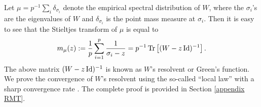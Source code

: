 Let $\mu=p^{-1}\sum_{i} \delta_{\sigma_i}$ denote the empirical spectral distribution of $W$, where the $\sigma_i$'s are the eigenvalues of $W$ and $\delta_{\sigma_i}$ is the point mass measure at $\sigma_i$. Then it is easy to see that the Stieltjes transform of $\mu$ is equal to
 \[ m_{\mu}(z) := \frac{1}{p}\sum_{i=1}^p \frac{1}{\sigma_i - z}= p^{-1}\operatorname{Tr}\left[(W-z\operatorname{Id})^{-1}\right]. \]
The above matrix $(W - z\operatorname{Id})^{-1}$ is known as $W$'s resolvent or Green's function.
We prove the convergence of $W$'s resolvent using the so-called ``local law'' with a sharp convergence rate \cite{isotropic,erdos2017dynamical,Anisotropic}. The complete proof is provided in Section \ref{appendix RMT}.



